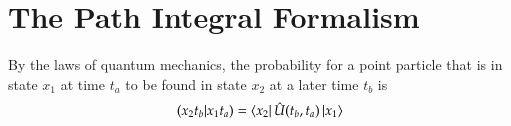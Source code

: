 \section{The Path Integral Formalism}

By the laws of quantum mechanics, the probability for a point particle that is in state $x_1$ at time $t_a$ to be found in state $x_2$ at a later time $t_b$ is
\begin{equation} \label{qmtp}
  (x_2 t_b | x_1 t_a) = \bra{x_2}\hat{U}(t_b,t_a)\ket{x_1}
\end{equation}
